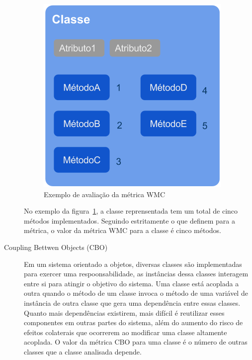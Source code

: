 \begin{description}
\begin{figure}[htb]
	\caption{\label{fig:pic_wmc}Exemplo de avaliação da métrica WMC}
	\begin{center}
		\includegraphics[scale=0.6]{img/pic_wmc.png}
	\end{center}
\end{figure}

No exemplo da figura~\ref{fig:pic_wmc}, a classe reprensentada tem um total de
cinco métodos implementados. Seguindo estritamente o que 
definem para a métrica, o valor da métrica WMC para a classe é cinco métodos.


\item[Coupling Bettwen Objects (CBO)]  Em um sistema orientado a objetos,
diversas classes são implementadas para exercer uma respoonsabilidade, as
instâncias dessa classes interagem entre si para atingir o objetivo do sistema.
Uma classe está acoplada a outra quando o método de um classe invoca o método de
uma variável de instância de outra classe que gera uma dependência entre essas
classes. Quanto mais dependências existirem, mais difícil é reutilizar esses
componentes em outras partes do sistema, além do aumento do risco de efeitos
colaterais que ocorrerem ao modificar uma classe altamente acoplada. O valor da
métrica CBO para uma classe é o número de outras classes que a classe analisada
depende.



\end{description}
